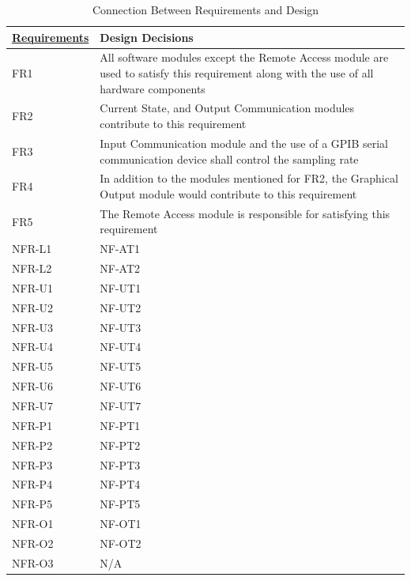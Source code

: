 \documentclass[12pt, titlepage]{article}
\begin{document}
\begin{table}[H]
	\centering
	\caption{Connection Between Requirements and Design}
	\label{my-label}
	\begin{tabular}{p{} p{}}
		\hline
		\textbf{\href{https://github.com/edwin-do/capstoneTeam30/blob/main/docs/SRS/SRS.pdf}{Requirements}} & \textbf{Design Decisions} \\ \hline
		FR1 & All software modules except the Remote Access module are used to satisfy this requirement along with the use of all hardware components \\ \hline
		FR2 & Current State, and Output Communication modules contribute to this requirement \\ \hline
		FR3 & Input Communication module and the use of a GPIB serial communication device shall control the sampling rate \\ \hline
		FR4 & In addition to the modules mentioned for FR2, the Graphical Output module would contribute to this requirement \\ \hline
		FR5 & The Remote Access module is responsible for satisfying this requirement \\ \hline
		NFR-L1 & NF-AT1 \\ \hline
		NFR-L2 & NF-AT2 \\ \hline
		NFR-U1 & NF-UT1 \\ \hline
		NFR-U2 & NF-UT2 \\ \hline
		NFR-U3 & NF-UT3 \\ \hline
	    NFR-U4 & NF-UT4 \\ \hline
	    NFR-U5 & NF-UT5\\ \hline
	    NFR-U6 & NF-UT6 \\ \hline
	    NFR-U7 & NF-UT7 \\ \hline
	    NFR-P1 & NF-PT1 \\ \hline
	    NFR-P2 & NF-PT2 \\ \hline
	    NFR-P3 & NF-PT3 \\ \hline
	    NFR-P4 & NF-PT4 \\ \hline
	    NFR-P5 & NF-PT5 \\ \hline
	    NFR-O1 & NF-OT1 \\ \hline
	    NFR-O2 & NF-OT2 \\ \hline
	    NFR-O3 & N/A \\ \hline
	\end{tabular}
\end{table}
\end{document}
